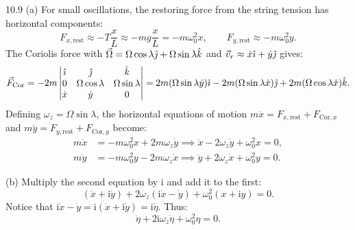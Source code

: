 \begin{tabletworkspace}[6.5cm]
\end{tabletworkspace}

\begin{solution}{10.9}
(a) For small oscillations, the restoring force from the string tension has horizontal components:
\[
F_{x, \text{rest}} \approx -T\frac{x}{L} \approx -mg\frac{x}{L} = -m\omega_0^2 x,\qquad F_{y, \text{rest}} \approx -m\omega_0^2 y.
\]
The Coriolis force with $\vec{\Omega} = \Omega\cos\lambda\hat{\jmath} + \Omega\sin\lambda\hat{k}$ and $\vec{v}_r \approx \dot{x}\hat{\imath} + \dot{y}\hat{\jmath}$ gives:
\[
\vec{F}_{\text{Cor}} = -2m\begin{vmatrix} \hat{\imath} & \hat{\jmath} & \hat{k} \\ 0 & \Omega\cos\lambda & \Omega\sin\lambda \\ \dot{x} & \dot{y} & 0 \end{vmatrix} = 2m(\Omega\sin\lambda\dot{y})\hat{\imath} - 2m(\Omega\sin\lambda\dot{x})\hat{\jmath} + 2m(\Omega\cos\lambda\dot{x})\hat{k}.
\]
Defining $\omega_z = \Omega\sin\lambda$, the horizontal equations of motion $m\ddot{x} = F_{x, \text{rest}} + F_{\text{Cor}, x}$ and $m\ddot{y} = F_{y, \text{rest}} + F_{\text{Cor}, y}$ become:
\begin{align*}
m\ddot{x} &= -m\omega_0^2 x + 2m\omega_z\dot{y} \implies \boxed{\ddot{x} - 2\omega_z\dot{y} + \omega_0^2 x = 0,} \\
m\ddot{y} &= -m\omega_0^2 y - 2m\omega_z\dot{x} \implies \boxed{\ddot{y} + 2\omega_z\dot{x} + \omega_0^2 y = 0.}
\end{align*}

(b) Multiply the second equation by $\mathrm{i}$ and add it to the first:
\[
(\ddot{x} + \mathrm{i}\ddot{y}) + 2\omega_z(\mathrm{i}\dot{x} - \dot{y}) + \omega_0^2(x + \mathrm{i}y) = 0.
\]
Notice that $\mathrm{i}\dot{x} - \dot{y} = \mathrm{i}(\dot{x} + \mathrm{i}\dot{y}) = \mathrm{i}\dot{\eta}$.
Thus:
\[
\boxed{\ddot{\eta} + 2\mathrm{i}\omega_z\dot{\eta} + \omega_0^2\eta = 0.}
\]


\end{solution}
